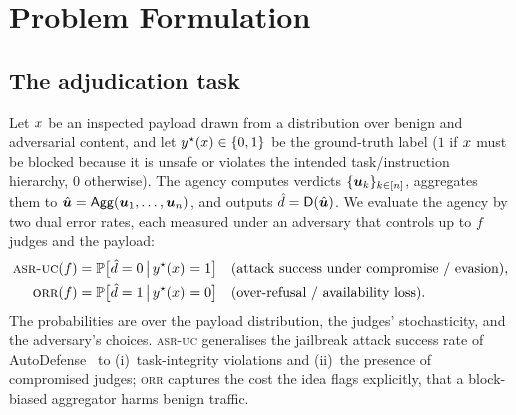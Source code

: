 \section{Problem Formulation}
\label{sec:problem}

\subsection{The adjudication task}
Let $x$ be an inspected payload drawn from a distribution over benign and adversarial
content, and let $y^\star(x)\in\{0,1\}$ be the ground-truth label ($1$ if $x$ must
be blocked because it is unsafe or violates the intended task/instruction hierarchy,
$0$ otherwise). The agency computes verdicts $\{\bm{u}_k\}_{k\in[n]}$, aggregates them to
$\hat{\bm{u}}=\mathsf{Agg}(\bm{u}_1,\dots,\bm{u}_n)$, and outputs $\hat d=\mathsf{D}(\hat{\bm{u}})$. We evaluate the
agency by two dual error rates, each measured under an adversary that controls up to $f$
judges and the payload:
\begin{align}
  \textsc{asr-uc}(f) &= \mathbb{P}\bigl[\hat d = 0 \,\big|\, y^\star(x)=1\bigr]
    && \text{(attack success under compromise / evasion)}, \label{eq:asruc}\\
  \textsc{orr}(f)   &= \mathbb{P}\bigl[\hat d = 1 \,\big|\, y^\star(x)=0\bigr]
    && \text{(over-refusal / availability loss)}. \label{eq:orr}
\end{align}
The probabilities are over the payload distribution, the judges' stochasticity, and the
adversary's choices. \textsc{asr-uc} generalises the jailbreak attack success rate of
AutoDefense~\cite{zeng2024autodefense} to (i)~task-integrity violations and (ii)~the
presence of compromised judges; \textsc{orr} captures the cost the idea flags explicitly,
that a block-biased aggregator harms benign traffic.

